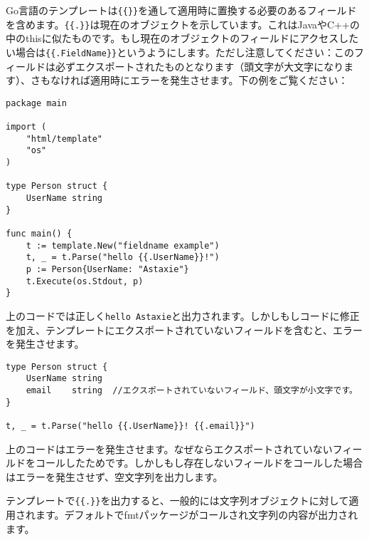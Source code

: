 Go言語のテンプレートは\texttt{\{\{\}\}}を通して適用時に置換する必要のあるフィールドを含めます。\texttt{\{\{.\}\}}は現在のオブジェクトを示しています。これはJavaやC++の中のthisに似たものです。もし現在のオブジェクトのフィールドにアクセスしたい場合は\texttt{\{\{.FieldName\}\}}というようにします。ただし注意してください：このフィールドは必ずエクスポートされたものとなります（頭文字が大文字になります）、さもなければ適用時にエラーを発生させます。下の例をご覧ください：

\begin{lstlisting}[numbers=none]
package main

import (
    "html/template"
    "os"
)

type Person struct {
    UserName string
}

func main() {
    t := template.New("fieldname example")
    t, _ = t.Parse("hello {{.UserName}}!")
    p := Person{UserName: "Astaxie"}
    t.Execute(os.Stdout, p)
}
\end{lstlisting}

上のコードでは正しく\texttt{hello Astaxie}と出力されます。しかしもしコードに修正を加え、テンプレートにエクスポートされていないフィールドを含むと、エラーを発生させます。

\begin{lstlisting}[numbers=none]
type Person struct {
    UserName string
    email    string  //エクスポートされていないフィールド、頭文字が小文字です。
}

t, _ = t.Parse("hello {{.UserName}}! {{.email}}")
\end{lstlisting}

上のコードはエラーを発生させます。なぜならエクスポートされていないフィールドをコールしたためです。しかしもし存在しないフィールドをコールした場合はエラーを発生させず、空文字列を出力します。

テンプレートで\texttt{\{\{.\}\}}を出力すると、一般的には文字列オブジェクトに対して適用されます。デフォルトでfmtパッケージがコールされ文字列の内容が出力されます。


